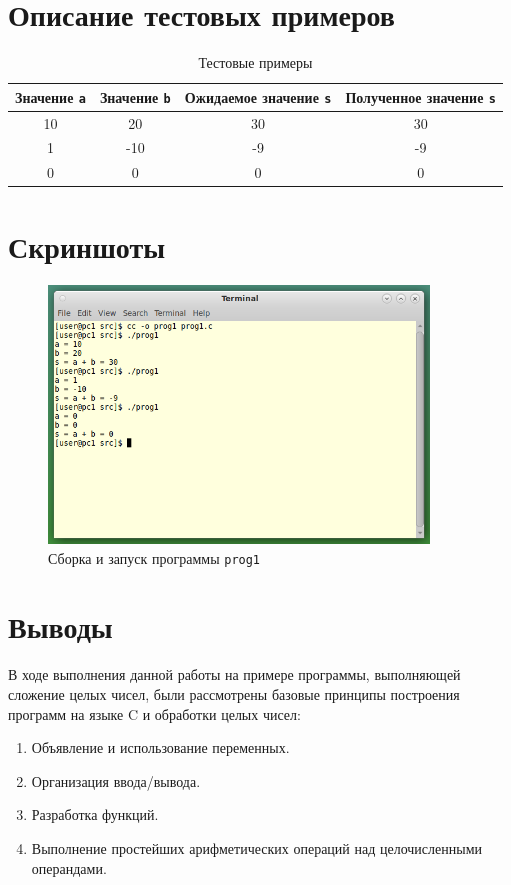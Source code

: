 \documentclass[12pt,a4paper,oneside]{article}
\begin{document}
% 

\section{Описание тестовых примеров}

\begin{table}[H]
  \centering
  \begin{tabular}{|| c | c | c | c ||}
    \hline
    Значение \texttt{a} & Значение \texttt{b} & Ожидаемое значение \texttt{s} & Полученное значение \texttt{s} \\
    \hline\hline
    10 & 20 & 30 & 30 \\
    \hline
    1 & -10 & -9 & -9 \\
    \hline
    0 & 0 & 0 & 0 \\
    \hline
  \end{tabular}
  \caption{Тестовые примеры}
\end{table}

 

\section{Скриншоты}

\begin{figure}[H]
  \centering
  \includegraphics[width=0.9\textwidth]{screen1}
  \caption{Сборка и запуск программы \texttt{prog1}}
\end{figure}


\section{Выводы}

В ходе выполнения данной работы на примере программы, выполняющей
сложение целых чисел, были рассмотрены базовые принципы
построения программ на языке C и обработки целых чисел:

\begin{enumerate}
  \item Объявление и использование переменных.
  \item Организация ввода/вывода.
  \item Разработка функций.
  \item Выполнение простейших арифметических операций над
    целочисленными операндами.
\end{enumerate}
\end{document}
